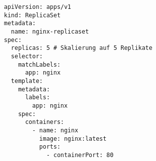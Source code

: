 \begin{verbatim}
apiVersion: apps/v1
kind: ReplicaSet
metadata:
  name: nginx-replicaset
spec:
  replicas: 5 # Skalierung auf 5 Replikate
  selector:
    matchLabels:
      app: nginx
  template:
    metadata:
      labels:
        app: nginx
    spec:
      containers:
        - name: nginx
          image: nginx:latest
          ports:
            - containerPort: 80

\end{verbatim}